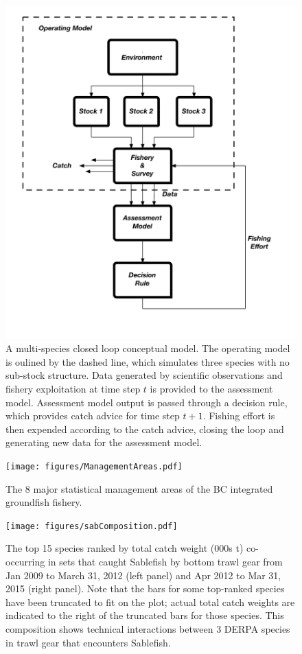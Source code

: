 \documentclass[]{scrartcl}
\begin{document}
\newpage

\begin{figure}[htbp]
\centering
\includegraphics{figures/MSE.pdf}
\caption{A multi-species closed loop conceptual model. The operating model is oulined by the dashed line, which simulates three species with no sub-stock structure. Data generated by scientific observations and fishery exploitation at time step $t$ is provided to the assessment model. Assessment model output is passed through a decision rule, which provides catch advice for time step $t+1$. Fishing effort is then expended according to the catch advice, closing the loop and generating new data for the assessment model.}\label{fig:MSMSE}
\end{figure}\newpage

\begin{figure}[htbp]
\centering
\texttt{[image: figures/ManagementAreas.pdf]}
\caption{The 8 major statistical management areas of the BC integrated groundfish fishery.}\label{fig:statAreas}
\end{figure}\newpage

\begin{figure}[htbp]
\centering
\texttt{[image: figures/sabComposition.pdf]}
\caption{The top 15 species ranked by total catch weight (000s t) co-occurring in sets that caught Sablefish by bottom trawl gear from Jan 2009 to March 31, 2012 (left panel) and Apr 2012 to Mar 31, 2015 (right panel). Note that the bars for some top-ranked species have been truncated to fit on the plot; actual total catch weights are indicated to the right of the truncated bars for those species. This composition shows technical interactions between 3 DERPA species in trawl gear that encounters Sablefish.}\label{fig:catchComposition}
\end{figure}
\end{document}
